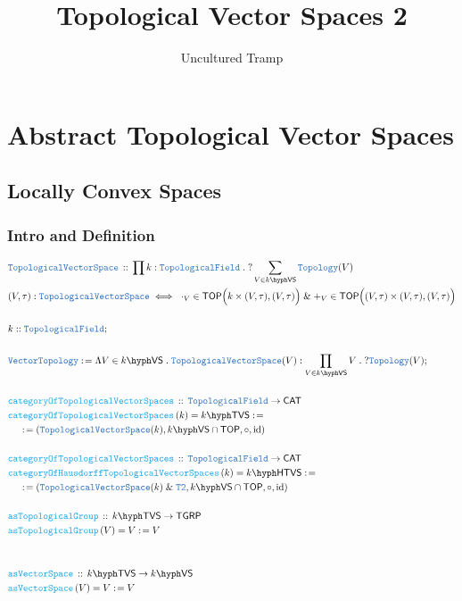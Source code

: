 \documentclass[12pt]{scrartcl}
\title{Topological Vector Spaces 2}
\author{Uncultured Tramp}
\newcommand{\TYPE}[1]{\textcolor{NavyBlue}{\mathtt{#1}}}
\newcommand{\FUNC}[1]{\textcolor{Cerulean}{\mathtt{#1}}}
\renewcommand{\.}{\; . \;}
\newcommand{\de}{: \kern 0.1pc =}
\newcommand{\Act}[1]{\left( #1 \right)}
\newcommand{\DeclareType}[2]{& \TYPE{#1} \, :: \, #2 \\}
\newcommand{\DefineType}[3]{& #1 : \TYPE{#2} \iff #3 \\}
\newcommand{\DeclareFunc}[2]{& \FUNC{#1} \, :: \, #2 \\}
\newcommand{\DefineNamedFunc}[4]{&  \FUNC{#1}\Act{#2} = #3 \de #4 \\}
\newcommand{\NewLine}{\\ & \kern 1pc}
\newcommand{\Page}[1]{ \begin{align*} #1 \end{align*}   }
\renewcommand{\And}{\; \& \;}
\DeclareMathOperator*{\id}{id}
\newcommand{\Conclude}[3]{& #1 \de #2 : #3; \\}
\newcommand{\CAT}{\mathsf{CAT}}
\newcommand{\Top}{\TYPE{Topology}}
\newcommand{\TOP}{\mathsf{TOP}}
\newcommand{\VS}[1]{#1\hyph\mathsf{VS}} %
\newcommand{\TGRP}{\mathsf{TGRP}}
\newcommand{\TopField}{\TYPE{TopologicalField}}
\newcommand{\TopVS}{\TYPE{TopologicalVectorSpace}}
\newcommand{\Vect}{\TYPE{Vector}}
\newcommand{\TVS}[1]{{#1}\hyph\mathsf{TVS}}
\newcommand{\HTVS}[1]{{#1}\hyph\mathsf{HTVS}}
\begin{document}
\maketitle
\newpage
\tableofcontents
\newpage
\section{Abstract Topological Vector Spaces}
\subsection{Locally Convex Spaces}
\subsubsection{Intro and Definition}
\Page{
	\DeclareType{\TopVS}{\prod k : \TopField \. ? \sum_{V \in \VS{k}} \Top(V)}
	\DefineType{(V,\tau)}{\TopVS}{\
		\cdot_V \in \TOP\Big( k \times (V,\tau),(V,\tau)\Big) \And 
		+_V \in \TOP\Big( (V,\tau) \times (V,\tau),(V,\tau)\Big)
	}
	\\
	& k :: \TopField ;\\
	\\
	\Conclude{\Vect\Top}{\Lambda V \in \VS{k} \. \TopVS(V)}
	{\prod_{V \in \VS{k}} V \. ? \Top(V)} 
	\\
	\DeclareFunc{categoryOfTopologicalVectorSpaces}
	{
		\TopField \to \CAT
	}
	\DefineNamedFunc{categoryOfTopologicalVectorSpaces}{k}{\TVS{k}}
	{
		\NewLine \de		
		(\TopVS(k),\VS{k} \cap \TOP,\circ,\id)
	}
	\\
	\DeclareFunc{categoryOfTopologicalVectorSpaces}
	{
		\TopField \to \CAT
	}
	\DefineNamedFunc{categoryOfHausdorffTopologicalVectorSpaces}{k}{\HTVS{k}}
	{
		\NewLine \de		
		(\TopVS(k) \And \TYPE{T2},\VS{k} \cap \TOP,\circ,\id)
	}
	\\
	\DeclareFunc{asTopologicalGroup}
	{
		\TVS{k} \to \TGRP
	}
	\DefineNamedFunc{asTopologicalGroup}{V}{V}{V}
	\\
	\\
	\DeclareFunc{asVectorSpace}
	{
		\TVS{k} \to \VS{k}
	}
	\DefineNamedFunc{asVectorSpace}{V}{V}{V}
	\\
}
\newpage
\end{document}
